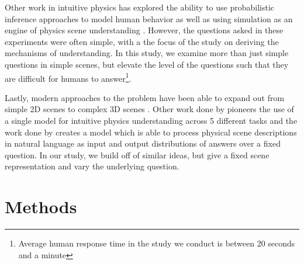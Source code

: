 \documentclass[10pt,letterpaper]{article}
\begin{document}
Other work in intuitive physics has explored the ability to use probabilistic inference approaches \cite{smith2013sources, smith2024intuitive} to model human behavior as well as using simulation as an engine of physics scene understanding \cite{battaglia2013simulation}. However, the questions asked in these experiments were often simple, with a the focus of the study on deriving the mechanisms of understanding. In this study, we examine more than just simple questions in simple scenes, but elevate the level of the questions such that they are difficult for humans to answer\footnote{Average human response time in the study we conduct is between 20 seconds and a minute}. 

Lastly, modern approaches to the problem have been able to expand out from simple 2D scenes to complex 3D scenes \cite{xue20233d}. Other work done by  pioneers the use of a single model for intuitive physics understanding across 5 different tasks and the work done by  creates a model which is able to process physical scene descriptions in natural language as input and output distributions of answers over a fixed question. In our study, we build off of similar ideas, but give a fixed scene representation and vary the underlying question. 

\section{Methods}
\end{document}
